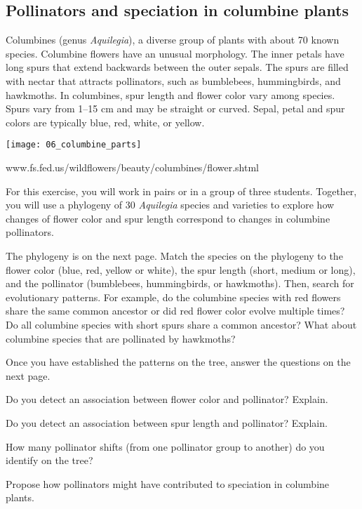 \documentclass[12pt, hidelinks]{exam}
\begin{document}
\subsection*{Pollinators and speciation in columbine plants}

Columbines (genus \textit{Aquilegia}), a diverse group of plants
with about 70 known species. Columbine flowers have an unusual
morphology. The inner petals have long spurs that extend backwards
between the outer sepals. The spurs are filled with nectar that attracts
pollinators, such as bumblebees, hummingbirds, and hawkmoths. In
columbines, spur length and flower color vary among species. Spurs vary from
1–15 cm and may be straight or curved. Sepal, petal and spur colors are
typically blue, red, white, or yellow.

\begin{center}
	\texttt{[image: 06\_columbine\_parts]}

	{\footnotesize
	www.fs.fed.us/wildflowers/beauty/columbines/flower.shtml}
\end{center}

For this exercise, you will work in pairs or in a group of three students. Together,
 you will use a phylogeny of 30 \textit{Aquilegia} species and
varieties to explore how changes of flower color and spur length
correspond to changes in columbine pollinators.

The phylogeny is on the next page. Match the species on the phylogeny
 to the flower color (blue, red, yellow or white), the spur length (short, medium or long), and the
pollinator (bumblebees, hummingbirds, or hawkmoths). Then,
search for evolutionary patterns. For example, do the columbine species
with red flowers share the same common ancestor or did red flower color
evolve multiple times? Do all columbine species with short spurs share a
common ancestor? What about columbine species that are pollinated by
hawkmoths?

Once you have established the patterns on the tree, answer the questions 
on the next page.


\begin{questions}

\question
Do you detect an association between flower color and pollinator? Explain.

\vspace{2\baselineskip}

\question
Do you detect an association between spur length and pollinator? Explain.

\vspace{2\baselineskip}

\question
How many pollinator shifts (from one pollinator group to
another) do you identify on the tree? 


\question
Propose how pollinators might have contributed to speciation in columbine plants.

\end{questions}
\end{document}
